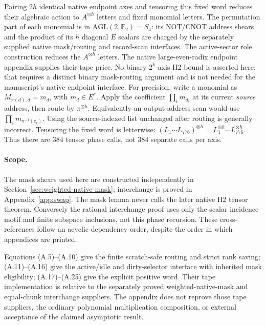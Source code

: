Pairing $2h$ identical native endpoint axes and tensoring this fixed word
reduces their algebraic action to $A^{\otimes h}$ letters and fixed
monomial letters. The permutation part of each monomial is in
$\mathrm{AGL}(2,\mathbb F_2)=S_4$: its NOT/CNOT address shears and the
product of its $h$ diagonal $E$ scalars are charged by the separately
supplied native mask/routing and record-scan interfaces. The active-sector
role construction reduces the $A^{\otimes h}$ letters. The native
large-even-radix endpoint appendix supplies their tape price. No binary
$2^k$-axis H2 bound is asserted here; that requires a distinct binary
mask-routing argument and is not needed for the manuscript's native
endpoint interface.
For precision, write a monomial as $M_{\pi(d),d}=m_d$, with
$m_d\in E^*$. Apply the coefficient $\prod_i m_{d_i}$ at its current
\emph{source} address, then route by $\pi^{\otimes h}$. Equivalently
an output-address scan would use $\prod_i m_{\pi^{-1}(e_i)}$.
Using the source-indexed list unchanged after routing is generally
incorrect. Tensoring the fixed word is letterwise:
$(L_1\cdots L_{776})^{\otimes h}
 =L_1^{\otimes h}\cdots L_{776}^{\otimes h}$.
Thus there are 384 tensor phase calls, not 384 separate calls per axis.

\paragraph{Scope.}
The mask shears used here are constructed independently in
Section~\ref{sec:weighted-native-mask}; interchange is proved in
Appendix~\ref{app:swap}. The mask lemma never calls the later native
H2 tensor theorem. Conversely the rational interchange proof uses
only the scalar incidence motif and finite subspace inclusions, not
this phase recursion. These cross-references follow an acyclic
dependency order, despite the order in which appendices are printed.

Equations (A.5)--(A.10) give the finite scratch-safe routing and strict
rank saving; (A.11)--(A.16) give the active/idle and dirty-selector
interface with inherited mask eligibility; (A.17)--(A.25) give the
explicit positive word. Their tape implementation is relative to the
separately proved weighted-native-mask and equal-chunk interchange
suppliers. The appendix does not reprove those tape suppliers, the ordinary
polynomial multiplication composition, or external acceptance of the
claimed asymptotic result.

